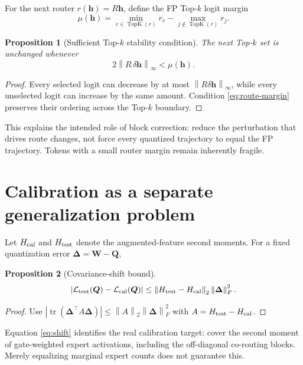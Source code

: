 \documentclass[11pt]{article}
\theoremstyle{plain}
\newtheorem{proposition}{Proposition}
\theoremstyle{definition}
\theoremstyle{remark}
\newcommand{\W}{\bm W}
\newcommand{\Q}{\bm Q}
\newcommand{\Err}{\bm\Delta}
\newcommand{\tr}{\operatorname{tr}}
\newcommand{\TopK}{\operatorname{TopK}}
\newcommand{\norm}[1]{\left\lVert#1\right\rVert}
\begin{document}
For the next router $r(\bm h)=R\bm h$, define the FP Top-$k$ logit margin
\begin{equation}
  \mu(\bm h)=\min_{e\in\TopK(r)}r_e-\max_{j\notin\TopK(r)}r_j.
\end{equation}

\begin{proposition}[Sufficient Top-$k$ stability condition]\label{prop:route}
The next Top-$k$ set is unchanged whenever
\begin{equation}\label{eq:route-margin}
  2\norm{R\,\delta\bm h}_\infty<\mu(\bm h).
\end{equation}
\end{proposition}

\begin{proof}
Every selected logit can decrease by at most $\norm{R\delta\bm h}_\infty$, while every unselected logit can increase by the same amount.  Condition \eqref{eq:route-margin} preserves their ordering across the Top-$k$ boundary.
\end{proof}

This explains the intended role of block correction: reduce the perturbation that drives route changes, not force every quantized trajectory to equal the FP trajectory.  Tokens with a small router margin remain inherently fragile.

\section{Calibration as a separate generalization problem}

Let $H_{\rm cal}$ and $H_{\rm test}$ denote the augmented-feature second moments.  For a fixed quantization error $\Err=\W-\Q$,
\begin{proposition}[Covariance-shift bound]\label{prop:shift}
\begin{equation}\label{eq:shift}
  \left|\mathcal L_{\rm test}(\Q)-\mathcal L_{\rm cal}(\Q)\right|
  \le \norm{H_{\rm test}-H_{\rm cal}}_2\norm{\Err}_F^2.
\end{equation}
\end{proposition}

\begin{proof}
Use $|\tr(\Err^\top A\Err)|\le\norm A_2\norm\Err_F^2$ with $A=H_{\rm test}-H_{\rm cal}$.
\end{proof}

Equation \eqref{eq:shift} identifies the real calibration target: cover the second moment of gate-weighted expert activations, including the off-diagonal co-routing blocks.  Merely equalizing marginal expert counts does not guarantee this.
\end{document}
